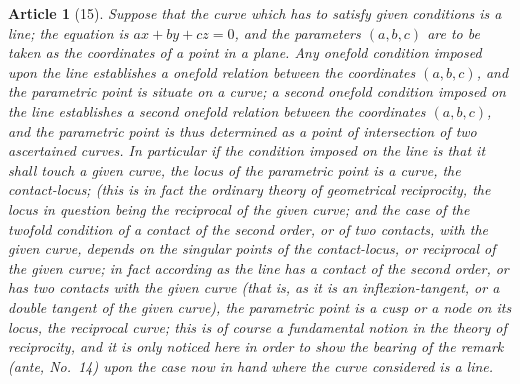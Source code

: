 \documentclass[11pt,a4paper]{article}
\theoremstyle{cayley}
\newtheorem{art}{Article}
\begin{document}
\begin{art}[15]
Suppose that the curve which has to satisfy given conditions is a line; the equation is $ax + by + cz = 0$, and the parameters $(a, b, c)$ are to be taken as the coordinates of a point in a plane. Any onefold condition imposed upon the line establishes a onefold relation between the coordinates $(a, b, c)$, and the parametric point is situate on a curve; a second onefold condition imposed on the line establishes a second onefold relation between the coordinates $(a, b, c)$, and the parametric point is thus determined as a point of intersection of two ascertained curves. In particular if the condition imposed on the line is that it shall touch a given curve, the locus of the parametric point is a curve, the contact-locus; (this is in fact the ordinary theory of geometrical reciprocity, the locus in question being the reciprocal of the given curve; and the case of the twofold condition of a contact of the second order, or of two contacts, with the given curve, depends on the singular points of the contact-locus, or reciprocal of the given curve; in fact according as the line has a contact of the second order, or has two contacts with the given curve (that is, as it is an inflexion-tangent, or a double tangent of the given curve), the parametric point is a cusp or a node on its locus, the reciprocal curve; this is of course a fundamental notion in the theory of reciprocity, and it is only noticed here in order to show the bearing of the remark (ante, No.~14) upon the case now in hand where the curve considered is a line.
\end{art}
\end{document}
